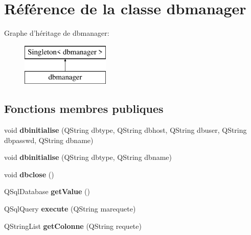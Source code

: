 \hypertarget{classdbmanager}{\section{Référence de la classe dbmanager}
\label{classdbmanager}
}
Graphe d'héritage de dbmanager\+:\begin{figure}[H]
\begin{center}
\leavevmode
\includegraphics[height=2.000000cm]{classdbmanager}
\end{center}
\end{figure}
\subsection*{Fonctions membres publiques}
\begin{DoxyCompactItemize}
\item 
\hypertarget{classdbmanager_ad0554aaf4742853ae68f2ce9c73e0f03}{void {\bfseries dbinitialise} (Q\+String dbtype, Q\+String dbhost, Q\+String dbuser, Q\+String dbpasswd, Q\+String dbname)}\label{classdbmanager_ad0554aaf4742853ae68f2ce9c73e0f03}

\item 
\hypertarget{classdbmanager_a6896e1989994ffb1dfbfdfb8bf91cb65}{void {\bfseries dbinitialise} (Q\+String dbtype, Q\+String dbname)}\label{classdbmanager_a6896e1989994ffb1dfbfdfb8bf91cb65}

\item 
\hypertarget{classdbmanager_ab6e8b56be8e6286dbe92406a969e2d0f}{void {\bfseries dbclose} ()}\label{classdbmanager_ab6e8b56be8e6286dbe92406a969e2d0f}

\item 
\hypertarget{classdbmanager_a74263e13f442c48179e7339370ad0df6}{Q\+Sql\+Database {\bfseries get\+Value} ()}\label{classdbmanager_a74263e13f442c48179e7339370ad0df6}

\item 
\hypertarget{classdbmanager_aadd93a1f6de3210ba3ff63fd1a769d65}{Q\+Sql\+Query {\bfseries execute} (Q\+String marequete)}\label{classdbmanager_aadd93a1f6de3210ba3ff63fd1a769d65}

\item 
\hypertarget{classdbmanager_a31cce1e1ece40bbeec5ee1ddda85614b}{Q\+String\+List {\bfseries get\+Colonne} (Q\+String requete)}\label{classdbmanager_a31cce1e1ece40bbeec5ee1ddda85614b}

\end{DoxyCompactItemize}
